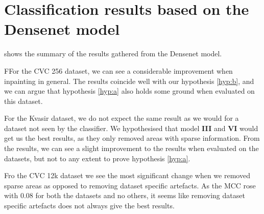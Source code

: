 \FloatBarrier





\section{Classification results based on the Densenet model}
 shows the summary of the results gathered from the Densenet model.

FFor the CVC 256 dataset, we can see a considerable improvement when inpainting in general. The results coincide well with our hypothesis \ref{hyp:b}, and we can argue that hypothesis \ref{hyp:a} also holds some ground when evaluated on this dataset.

For the Kvasir dataset, we do not expect the same result as we would for a dataset not seen by the classifier. We hypothesised that model \textbf{III} and \textbf{VI} would get us the best results, as they only removed areas with sparse information. From the results, we can see a slight improvement to the results when evaluated on the datasets, but not to any extent to prove hypothesis \ref{hyp:a}.

Fro the CVC 12k dataset we see the most significant change when we removed sparse areas as opposed to removing dataset specific artefacts. As the MCC rose with 0.08 for both the datasets and no others, it seems like removing dataset specific artefacts does not always give the best results.


